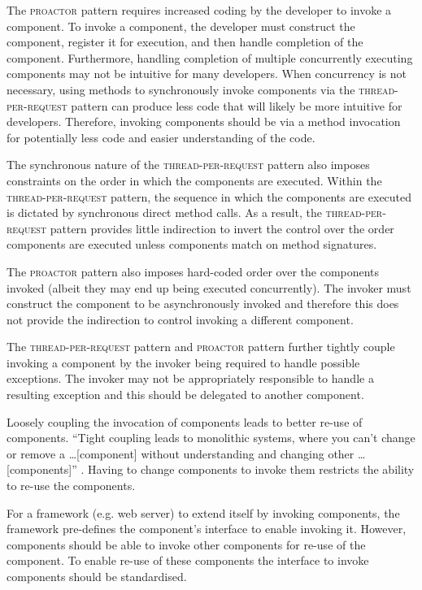 \documentclass[prodmode]{style/acmlarge}
\begin{document}
The \textsc{proactor} pattern requires increased coding by the developer to
invoke a component.  To invoke a component, the developer must construct the
component, register it for execution, and then handle completion of the
component.  Furthermore, handling completion of multiple concurrently executing
components may not be intuitive for many developers.  When concurrency is not
necessary, using methods to synchronously invoke components via the
\textsc{thread-per-request} pattern can produce less code that will likely be
more intuitive for developers.  Therefore, invoking components should be via a
method invocation for potentially less code and easier understanding of the
code.

The synchronous nature of the \textsc{thread-per-request} pattern also imposes
constraints on the order in which the components are executed.  Within the
\textsc{thread-per-request} pattern, the sequence in which the components are
executed is dictated by synchronous direct method calls.  As a result, the
\textsc{thread-per-request} pattern provides little indirection to invert the
control over the order components are executed unless components match on method
signatures.

The \textsc{proactor} pattern also imposes hard-coded order over the components
invoked (albeit they may end up being executed concurrently).  The invoker must
construct the component to be asynchronously invoked and therefore this does not
provide the indirection to control invoking a different component.

The \textsc{thread-per-request} pattern and \textsc{proactor} pattern further
tightly couple invoking a component by the invoker being required to handle
possible exceptions.  The invoker may not be appropriately responsible to handle
a resulting exception and this should be delegated to another component.

Loosely coupling the invocation of components leads to better re-use of
components.  ``Tight coupling leads to monolithic systems, where you can't
change or remove a \ldots [component] without understanding and changing other
\ldots [components]'' \cite[p. 24-25]{gof}.  Having to change components to
invoke them restricts the ability to re-use the components.

For a framework (e.g. web server) to extend itself by invoking components, the
framework pre-defines the component's interface to enable invoking it.  However,
components should be able to invoke other components for re-use of the
component.  To enable re-use of these components the interface to invoke
components should be standardised.
\end{document}
